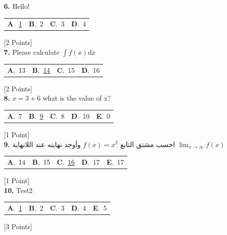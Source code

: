 \documentclass[12pt]{article}
\newcommand{\choice}[2]{\textbf{#1}.~#2}
\begin{document}
\noindent \textbf{\textenglish{6.}} {\textenglish{Hello!}}

\begin{tabularx}{\linewidth}{@{}*{4}{Y}@{}}
\choice{A}{{\underline{{\textenglish{1}}}}} & \choice{B}{{{\textenglish{2}}}} & \choice{C}{{{\textenglish{3}}}} & \choice{D}{{{\textenglish{4}}}} \\
\end{tabularx}
\hfill {\textenglish{[2 Points]}}\\[0.5em]

\noindent \textbf{\textenglish{7.}} {\textenglish{Please calculate }}\(\int f(x)dx\)

\begin{tabularx}{\linewidth}{@{}*{4}{Y}@{}}
\choice{A}{{{\textenglish{13}}}} & \choice{B}{{\underline{{\textenglish{14}}}}} & \choice{C}{{{\textenglish{15}}}} & \choice{D}{{{\textenglish{16}}}} \\
\end{tabularx}
\hfill {\textenglish{[2 Points]}}\\[0.5em]

\noindent \textbf{\textenglish{8.}} \(x=3+6 \){\textenglish{ what is the value of x?}}

\begin{tabularx}{\linewidth}{@{}*{5}{Y}@{}}
\choice{A}{{{\textenglish{7}}}} & \choice{B}{{\underline{{\textenglish{9}}}}} & \choice{C}{{{\textenglish{8}}}} & \choice{D}{{{\textenglish{10}}}} & \choice{E}{{{\textenglish{0}}}} \\
\end{tabularx}
\hfill {\textenglish{[1 Point]}}\\[0.5em]

\noindent \textbf{\textenglish{9.}} {\textarabic{احسب مشتق التابع }}\( f(x) = x^2\){\textarabic{ وأوجد نهايته عند اللانهاية }}\(\lim_{x \to \infty}f(x)\)

\begin{tabularx}{\linewidth}{@{}*{5}{Y}@{}}
\choice{A}{{{\textenglish{14}}}} & \choice{B}{{{\textenglish{15}}}} & \choice{C}{{\underline{{\textenglish{16}}}}} & \choice{D}{{{\textenglish{17}}}} & \choice{E}{{{\textenglish{17}}}} \\
\end{tabularx}
\hfill {\textenglish{[1 Point]}}\\[0.5em]

\noindent \textbf{\textenglish{10.}} {\textenglish{Test2}}

\begin{tabularx}{\linewidth}{@{}*{5}{Y}@{}}
\choice{A}{{\underline{{\textenglish{1}}}}} & \choice{B}{{{\textenglish{2}}}} & \choice{C}{{{\textenglish{3}}}} & \choice{D}{{{\textenglish{4}}}} & \choice{E}{{{\textenglish{5}}}} \\
\end{tabularx}
\hfill {\textenglish{[3 Points]}}\\[0.5em]
\end{document}
